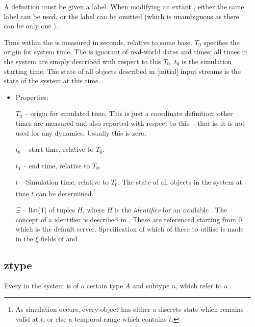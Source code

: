 A  definition must be given a label.  When modifying an
extant , either the same label can be used, or the label
can be omitted (which is unambiguous as there can be only one ).

Time within the  is measured in seconds, relative to some base.
$T_0$ specifies the origin for system
time. The  is ignorant of real-world dates and times;
all times in the system are simply described with respect to this $T_0$.
$t_0$ is the simulation starting time. The state of all objects described
in [initial] input streams is the state of the system at this time.


\begin{itemize}

\item Properties:

  $T_{0}$ -- origin for simulated time.  This is just a coordinate
  definition; other times are measured and also reported with respect
  to this -- that is, it is not used for any dynamics. Usually this is
  zero.

  $t_{0}$ -- start time, relative to $T_0$. %
  
  $t_{1}$  -- end time, relative to $T_0$. %
  
  $t$ -- Simulation time, relative to $T_{0}$.  The state of all objects in the system at time $t$
  can be determined.\footnote{As simulation occurs, every object has either a discrete state which
    remains valid at $t$, or else a temporal range which contains $t$.}

  $\Xi$ -- list(1) of tuples $H$, where $H$ is the \emph{identifier} for an available .
  The concept of a  identifier is described in .
  These are referenced starting from $0$, which is the default server.
  Specification of which of these to utilise is made in the $\xi$ fields of  and 
  
\end{itemize}

\subsection{ztype}

Every  in the system is of a certain type $A$ and subtype
$n$, which refer to a .

